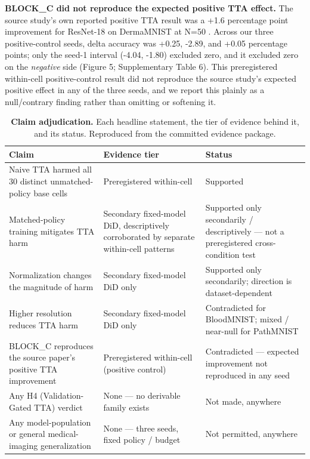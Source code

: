 \textbf{BLOCK\_C did not reproduce the expected positive TTA effect.} The source study's own reported positive TTA result was a +1.6 percentage point improvement for ResNet-18 on DermaMNIST at N=50 \citep{medeiros2026tta}. Across our three positive-control seeds, delta accuracy was +0.25, -2.89, and +0.05 percentage points; only the seed-1 interval (-4.04, -1.80) excluded zero, and it excluded zero on the \emph{negative} side (Figure 5; Supplementary Table 6). This preregistered within-cell positive-control result did not reproduce the source study's expected positive effect in any of the three seeds, and we report this plainly as a null/contrary finding rather than omitting or softening it.

\setcounter{table}{6}
\begin{table}[t]
\centering
\small
\begin{tabular}{@{}p{4.6cm}p{4.0cm}p{4.4cm}@{}}
\toprule
\textbf{Claim} & \textbf{Evidence tier} & \textbf{Status} \\
\midrule
Naive TTA harmed all 30 distinct unmatched-policy base cells & Preregistered within-cell & Supported \\
Matched-policy training mitigates TTA harm & Secondary fixed-model DiD, descriptively corroborated by separate within-cell patterns & Supported only secondarily / descriptively --- not a preregistered cross-condition test \\
Normalization changes the magnitude of harm & Secondary fixed-model DiD only & Supported only secondarily; direction is dataset-dependent \\
Higher resolution reduces TTA harm & Secondary fixed-model DiD only & Contradicted for BloodMNIST; mixed / near-null for PathMNIST \\
BLOCK\_C reproduces the source paper's positive TTA improvement & Preregistered within-cell (positive control) & Contradicted --- expected improvement not reproduced in any seed \\
Any H4 (Validation-Gated TTA) verdict & None --- no derivable family exists & Not made, anywhere \\
Any model-population or general medical-imaging generalization & None --- three seeds, fixed policy / budget & Not permitted, anywhere \\
\bottomrule
\end{tabular}
\caption{\textbf{Claim adjudication.} Each headline statement, the tier of evidence behind it, and its status. Reproduced from the committed evidence package.}
\label{tab:claims}
\end{table}

